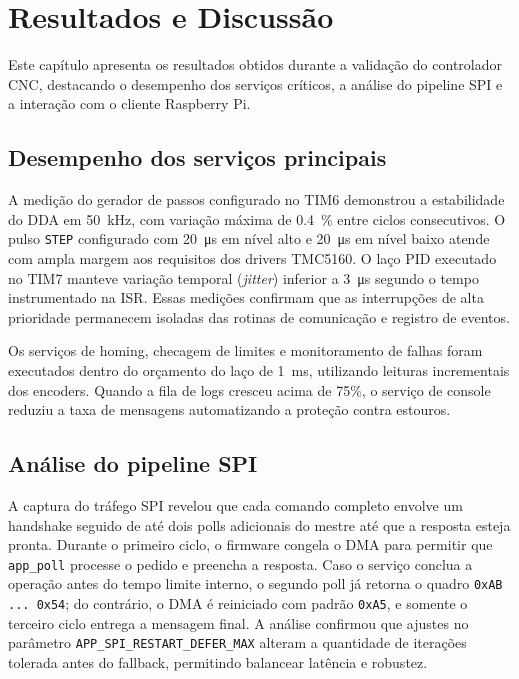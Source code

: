 \chapter{Resultados e Discussão}\label{cap:resultados}

Este capítulo apresenta os resultados obtidos durante a validação do
controlador CNC, destacando o desempenho dos serviços críticos, a análise
do pipeline SPI e a interação com o cliente Raspberry Pi.

\section{Desempenho dos serviços principais}

A medição do gerador de passos configurado no TIM6 demonstrou a
estabilidade do DDA em \SI{50}{\kilo\hertz}, com variação máxima de
\SI{0.4}{\percent} entre ciclos consecutivos. O pulso \texttt{STEP}
configurado com \SI{20}{\micro\second} em n\'ivel alto e
\SI{20}{\micro\second} em n\'ivel baixo atende com ampla margem aos
requisitos dos drivers TMC5160. O laço
PID executado no TIM7 manteve variação temporal (\emph{jitter}) inferior a \SI{3}{\micro\second}
segundo o tempo instrumentado na ISR. Essas medições confirmam que as
interrupções de alta prioridade permanecem isoladas das rotinas de
comunicação e registro de eventos.

Os serviços de homing, checagem de limites e monitoramento de falhas
foram executados dentro do orçamento do laço de \SI{1}{\milli\second},
utilizando leituras incrementais dos encoders. Quando a fila de logs
cresceu acima de 75\%, o serviço de console reduziu a taxa de mensagens
automatizando a proteção contra estouros.

\section{Análise do pipeline SPI}

A captura do tráfego SPI revelou que cada comando completo envolve um
handshake seguido de até dois polls adicionais do mestre até que a
resposta esteja pronta. Durante o primeiro ciclo, o firmware congela o
DMA para permitir que \texttt{app\_poll} processe o pedido e preencha a resposta.
Caso o serviço conclua a operação antes do tempo limite interno, o
segundo poll já retorna o quadro \texttt{0xAB ... 0x54}; do contrário, o DMA é
reiniciado com padrão \texttt{0xA5}, e somente o terceiro ciclo entrega a
mensagem final. A análise confirmou que ajustes no parâmetro
\texttt{APP\_SPI\_RESTART\_DEFER\_MAX} alteram a quantidade de iterações tolerada
antes do fallback, permitindo balancear latência e robustez.

